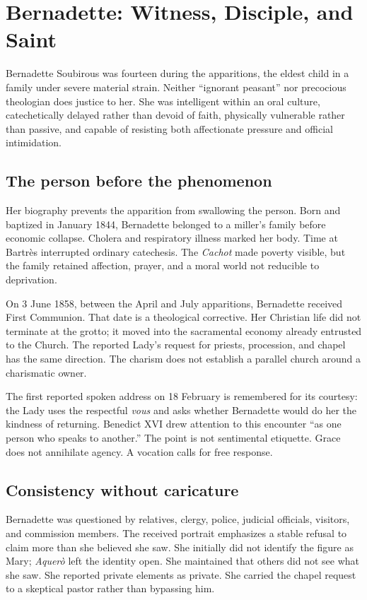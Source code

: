 \section{Bernadette: Witness, Disciple, and Saint}

Bernadette Soubirous was fourteen during the apparitions, the eldest child in a family under severe material strain. Neither “ignorant peasant” nor precocious theologian does justice to her. She was intelligent within an oral culture, catechetically delayed rather than devoid of faith, physically vulnerable rather than passive, and capable of resisting both affectionate pressure and official intimidation.

\subsection{The person before the phenomenon}

Her biography prevents the apparition from swallowing the person. Born and baptized in January 1844, Bernadette belonged to a miller's family before economic collapse. Cholera and respiratory illness marked her body. Time at Bartrès interrupted ordinary catechesis. The \emph{Cachot} made poverty visible, but the family retained affection, prayer, and a moral world not reducible to deprivation.

On 3 June 1858, between the April and July apparitions, Bernadette received First Communion. That date is a theological corrective. Her Christian life did not terminate at the grotto; it moved into the sacramental economy already entrusted to the Church. The reported Lady's request for priests, procession, and chapel has the same direction. The charism does not establish a parallel church around a charismatic owner.

The first reported spoken address on 18 February is remembered for its courtesy: the Lady uses the respectful \emph{vous} and asks whether Bernadette would do her the kindness of returning. Benedict XVI drew attention to this encounter “as one person who speaks to another.” The point is not sentimental etiquette. Grace does not annihilate agency. A vocation calls for free response.

\subsection{Consistency without caricature}

Bernadette was questioned by relatives, clergy, police, judicial officials, visitors, and commission members. The received portrait emphasizes a stable refusal to claim more than she believed she saw. She initially did not identify the figure as Mary; \emph{Aquerò} left the identity open. She maintained that others did not see what she saw. She reported private elements as private. She carried the chapel request to a skeptical pastor rather than bypassing him.

